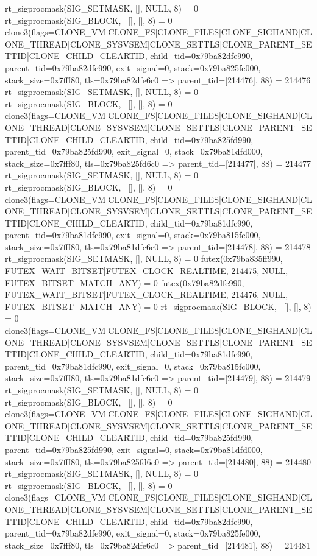 \begin{breakableverbatim}
rt_sigprocmask(SIG_SETMASK, [], NULL, 8) = 0
rt_sigprocmask(SIG_BLOCK, ~[], [], 8)   = 0
clone3({flags=CLONE_VM|CLONE_FS|CLONE_FILES|CLONE_SIGHAND|CLONE_THREAD|CLONE_SYSVSEM|CLONE_SETTLS|CLONE_PARENT_SETTID|CLONE_CHILD_CLEARTID, child_tid=0x79ba82dfe990, parent_tid=0x79ba82dfe990, exit_signal=0, stack=0x79ba825fe000, stack_size=0x7fff80, tls=0x79ba82dfe6c0} => {parent_tid=[214476]}, 88) = 214476
rt_sigprocmask(SIG_SETMASK, [], NULL, 8) = 0
rt_sigprocmask(SIG_BLOCK, ~[], [], 8)   = 0
clone3({flags=CLONE_VM|CLONE_FS|CLONE_FILES|CLONE_SIGHAND|CLONE_THREAD|CLONE_SYSVSEM|CLONE_SETTLS|CLONE_PARENT_SETTID|CLONE_CHILD_CLEARTID, child_tid=0x79ba825fd990, parent_tid=0x79ba825fd990, exit_signal=0, stack=0x79ba81dfd000, stack_size=0x7fff80, tls=0x79ba825fd6c0} => {parent_tid=[214477]}, 88) = 214477
rt_sigprocmask(SIG_SETMASK, [], NULL, 8) = 0
rt_sigprocmask(SIG_BLOCK, ~[], [], 8)   = 0
clone3({flags=CLONE_VM|CLONE_FS|CLONE_FILES|CLONE_SIGHAND|CLONE_THREAD|CLONE_SYSVSEM|CLONE_SETTLS|CLONE_PARENT_SETTID|CLONE_CHILD_CLEARTID, child_tid=0x79ba81dfc990, parent_tid=0x79ba81dfc990, exit_signal=0, stack=0x79ba815fc000, stack_size=0x7fff80, tls=0x79ba81dfc6c0} => {parent_tid=[214478]}, 88) = 214478
rt_sigprocmask(SIG_SETMASK, [], NULL, 8) = 0
futex(0x79ba835ff990, FUTEX_WAIT_BITSET|FUTEX_CLOCK_REALTIME, 214475, NULL, FUTEX_BITSET_MATCH_ANY) = 0
futex(0x79ba82dfe990, FUTEX_WAIT_BITSET|FUTEX_CLOCK_REALTIME, 214476, NULL, FUTEX_BITSET_MATCH_ANY) = 0
rt_sigprocmask(SIG_BLOCK, ~[], [], 8)   = 0
clone3({flags=CLONE_VM|CLONE_FS|CLONE_FILES|CLONE_SIGHAND|CLONE_THREAD|CLONE_SYSVSEM|CLONE_SETTLS|CLONE_PARENT_SETTID|CLONE_CHILD_CLEARTID, child_tid=0x79ba81dfc990, parent_tid=0x79ba81dfc990, exit_signal=0, stack=0x79ba815fc000, stack_size=0x7fff80, tls=0x79ba81dfc6c0} => {parent_tid=[214479]}, 88) = 214479
rt_sigprocmask(SIG_SETMASK, [], NULL, 8) = 0
rt_sigprocmask(SIG_BLOCK, ~[], [], 8)   = 0
clone3({flags=CLONE_VM|CLONE_FS|CLONE_FILES|CLONE_SIGHAND|CLONE_THREAD|CLONE_SYSVSEM|CLONE_SETTLS|CLONE_PARENT_SETTID|CLONE_CHILD_CLEARTID, child_tid=0x79ba825fd990, parent_tid=0x79ba825fd990, exit_signal=0, stack=0x79ba81dfd000, stack_size=0x7fff80, tls=0x79ba825fd6c0} => {parent_tid=[214480]}, 88) = 214480
rt_sigprocmask(SIG_SETMASK, [], NULL, 8) = 0
rt_sigprocmask(SIG_BLOCK, ~[], [], 8)   = 0
clone3({flags=CLONE_VM|CLONE_FS|CLONE_FILES|CLONE_SIGHAND|CLONE_THREAD|CLONE_SYSVSEM|CLONE_SETTLS|CLONE_PARENT_SETTID|CLONE_CHILD_CLEARTID, child_tid=0x79ba82dfe990, parent_tid=0x79ba82dfe990, exit_signal=0, stack=0x79ba825fe000, stack_size=0x7fff80, tls=0x79ba82dfe6c0} => {parent_tid=[214481]}, 88) = 214481

\end{breakableverbatim}

